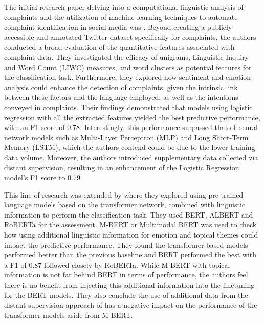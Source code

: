 The initial research paper delving into a computational linguistic analysis of complaints and the utilization of machine learning techniques to automate complaint identification in social media was \cite{preotiuc-pietro_automatically_2019}. Beyond creating a publicly accessible and annotated Twitter dataset specifically for complaints, the authors conducted a broad evaluation of the quantitative features associated with complaint data. They investigated the efficacy of unigrams, Linguistic Inquiry and Word Count (LIWC) measures, and word clusters as potential features for the classification task. Furthermore, they explored how sentiment and emotion analysis could enhance the detection of complaints, given the intrinsic link between these factors and the language employed, as well as the intentions conveyed in complaints. Their findings demonstrated that models using logistic regression with all the extracted features yielded the best predictive performance, with an F1 score of 0.78. Interestingly, this performance surpassed that of neural network models such as Multi-Layer Perceptron (MLP) and Long Short-Term Memory (LSTM), which the authors contend could be due to the lower training data volume. Moreover, the authors introduced supplementary data collected via distant supervision, resulting in an enhancement of the Logistic Regression model's F1 score to 0.79.

This line of research was extended by \cite{jin_complaint_2020} where they explored using pre-trained language models based on the transformer \cite{vaswaniAttentionAllYou2023a} network, combined with linguistic information to perform the classification task. They used BERT, ALBERT and RoBERTa for the assessment. M-BERT or Multimodal BERT was used to check how using additional linguistic information for emotion and topical themes could impact the predictive performance. They found the transformer based models performed better than the previous baseline \cite{preotiuc-pietro_automatically_2019} and BERT performed the best with a F1 of 0.87 followed closely by RoBERTa. While M-BERT with topical information is not far behind BERT in terms of performance, the authors feel there is no benefit from injecting this additional information into the finetuning for the BERT models. They also conclude the use of additional data from the distant supervision approach of \cite{preotiuc-pietro_automatically_2019} has a negative impact on the performance of the transformer models aside from M-BERT. 

